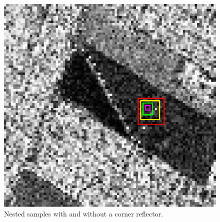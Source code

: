 \documentclass[twocolumn]{svjour3}
\begin{document}
	\begin{figure}[hbt]
		\centering
		\includegraphics[width=\linewidth]{CornerJulia_Roja.eps}
		\caption{Nested samples with and without a corner reflector.}\label{CornerReflector}
	\end{figure}
	
\end{document}

